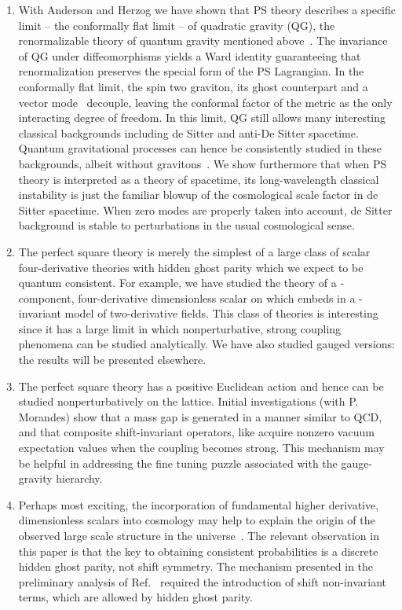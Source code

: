 \documentclass[pra,aps,amsmath,amssymb,notitlepage, twocolumn,superscriptaddress,longbibliography,nofootinbib,floatfix,10pt]{revtex4-2}
\makeatletter
\newcounter{mathrecordid}
\newcommand{\mathboxbegin}[1]{%
  \stepcounter{mathrecordid}%
  \immediate\write\mathrecords{\themathrecordid,#1}%
  \special{pdf:bann << /Type /Annot /Subtype /Link /Border [0 0 0]
    /MathBoxID \themathrecordid /F 2
    /A << /S /URI /URI (urn:mathbox:\themathrecordid) >> >>}}
\newcommand{\mathboxinlineplain}[1]{$#1$}
\newcommand{\mathboxinline}[1]{%
  $\mathboxbegin{inline}#1\special{pdf:eann}$}
\newcommand{\recordmath}{%
  \ifmeasuring@\expandafter\mathboxinlineplain
  \else\expandafter\mathboxinline\fi}
\makeatother
\begin{document}
\begin{enumerate}
\item With Anderson and Herzog we have shown that PS theory describes a specific limit -- the conformally flat limit -- of quadratic gravity (QG), the renormalizable theory of quantum gravity mentioned above~\cite{ABHTshort}. The invariance of QG under diffeomorphisms yields a Ward identity guaranteeing that renormalization preserves the special form of the PS Lagrangian. 
In the conformally flat limit, the spin two graviton, its ghost counterpart and a vector mode~\cite{Riegert:1984zz} decouple, leaving the conformal factor of the metric as the only interacting degree of freedom. In this limit, QG still allows many interesting classical backgrounds including de Sitter and anti-De Sitter spacetime. Quantum gravitational processes can hence be consistently studied in these backgrounds, albeit without gravitons~\cite{ABHTshort}. We show furthermore that when PS theory is interpreted as a theory of spacetime, its long-wavelength classical instability is just the familiar blowup of the cosmological scale factor in de Sitter spacetime. When zero modes are properly taken into account, de Sitter background is stable to perturbations in the usual cosmological sense. %


\item The perfect square theory is merely the simplest of a large class of scalar four-derivative theories with hidden ghost parity which we expect to be quantum consistent. For example, we have studied the theory of a \recordmath{N}-component, four-derivative dimensionless scalar on \recordmath{\mathbb{R}\times S^{N-1}} which embeds in a \recordmath{O(N,N)}-invariant model of two-derivative fields. This class of theories is interesting since it has a large \recordmath{N} limit in which nonperturbative, strong coupling phenomena can be studied analytically. We have also studied gauged versions: the results will be presented elsewhere. 
\item The perfect square theory has a positive Euclidean action and hence can be studied nonperturbatively on the lattice. Initial investigations (with P. Morandes)  show that a mass gap is generated in a manner similar to QCD, and that composite shift-invariant operators, like \recordmath{(\partial \phi)^2} acquire nonzero vacuum expectation values when the coupling \recordmath{\lambda} becomes strong.
This mechanism may be helpful in addressing the fine tuning puzzle associated with the gauge-gravity hierarchy. 
\item Perhaps most exciting, the incorporation of fundamental higher derivative, dimensionless scalars into cosmology may help to explain the origin of the observed large scale structure in the universe~\cite{Turok:2023amx}. The relevant observation in this paper is that the key to obtaining consistent probabilities is a discrete hidden ghost parity, not shift symmetry. The mechanism  presented in the preliminary analysis of Ref.~\cite{Turok:2023amx} required the introduction of shift non-invariant terms, which are allowed by hidden ghost parity.  

\end{enumerate}
\end{document}
